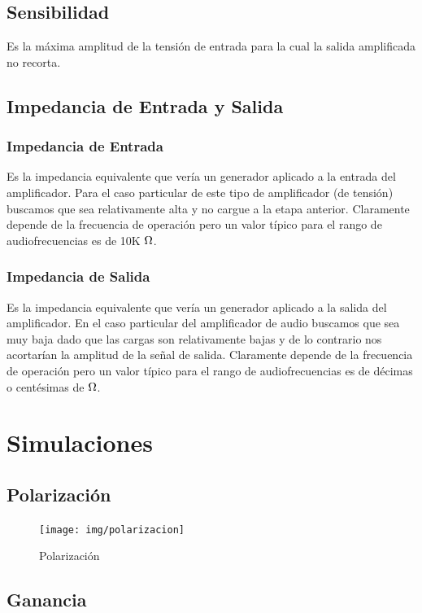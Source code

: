 \documentclass[a4paper,12pt,twoside]{article}
\begin{document}
\subsection{Sensibilidad}

Es la máxima amplitud de la tensión de entrada para la cual la salida amplificada no recorta.

\subsection{Impedancia de Entrada y Salida}

\subsubsection*{Impedancia de Entrada}


 Es la impedancia equivalente que vería un generador aplicado a la entrada del amplificador. Para el caso particular de este tipo de amplificador (de tensión) buscamos que sea relativamente alta y no cargue a la etapa anterior. Claramente depende de la frecuencia de operación pero un valor típico para el rango de audiofrecuencias es de 10K $\ohm$.
\medskip 
\subsubsection*{Impedancia de Salida}


Es la impedancia equivalente que vería un generador aplicado a la salida del amplificador. En el caso particular del amplificador de audio buscamos que sea muy baja dado que las cargas son relativamente bajas y de lo contrario nos acortarían la amplitud de la señal de salida. Claramente depende de la frecuencia de operación pero un valor típico para el rango de audiofrecuencias es de décimas o centésimas de $\ohm$.


\newpage
\section{Simulaciones}
\subsection{Polarización}
\begin{figure}[H]
	\centering
	\texttt{[image: img/polarizacion]}
	\caption{Polarización}
	\label{fa}
\end{figure}


\subsection{Ganancia}
\end{document}
